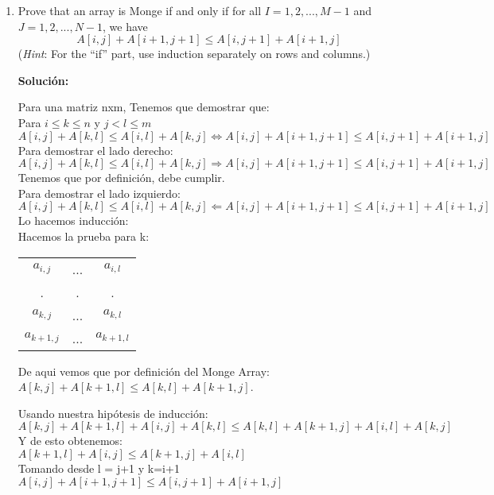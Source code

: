\documentclass{article}
\begin{document}
\begin{enumerate}[label=\textbf{\alph*.}]
  \item Prove that an array is Monge if and only if for all $I=1, 2, ..., M-1$ and $J=1, 2, ..., N-1$, we have
  $$A[i, j] + A[i+1, j+1] \leq A[i, j+1] + A[i+1, j]$$
  (\emph{Hint}: For the ``if'' part, use induction separately on rows and columns.)
  
  \textbf{Solución:}
  
  Para una matriz nxm, Tenemos que demostrar que:\\
  Para $i \leq k \leq n$ y $j < l \leq m$\\
  $A[i, j] + A[k, l] \leq A[i, l] + A[k, j] \Leftrightarrow A[i, j] + A[i+1, j+1] \leq A[i, j+1] + A[i+1, j]$\\
  
  Para demostrar el lado derecho:\\
  $A[i, j] + A[k, l] \leq A[i, l] + A[k, j] \Rightarrow A[i, j] + A[i+1, j+1] \leq A[i, j+1] + A[i+1, j]$\\
  Tenemos que por definición, debe cumplir.\\
  
  
  Para demostrar el lado izquierdo:\\
  $A[i, j] + A[k, l] \leq A[i, l] + A[k, j] \Leftarrow A[i, j] + A[i+1, j+1] \leq A[i, j+1] + A[i+1, j]$\\
  Lo hacemos inducción:\\
  Hacemos la prueba para k:\\
  \begin{center}
    \begin{tabular}{ccc}
      $a_{i,j}$ & ... & $a_{i,l}$\\
      . & . & .\\
      $a_{k,j}$ &  ... & $a_{k,l}$\\
      $a_{k+1,j}$ & ... & $a_{k+1,l}$
    \end{tabular}
  \end{center}
  
  De aqui vemos que por definición del Monge Array:\\
  $A[k, j] + A[k+1, l] \leq A[k, l] + A[k+1, j]$.
  
  Usando nuestra hipótesis de inducción:\\
  $A[k, j] + A[k+1, l] + A[i,j] + A[k,l] \leq A[k, l] + A[k+1, j] + A[i,l] + A[k,j]$\\
  Y de esto obtenemos:\\
  $A[k+1, l] + A[i,j] \leq  A[k+1, j] + A[i,l]$\\
  Tomando desde l = j+1 y k=i+1\\
  $A[i,j] + A[i+1, j+1] \leq A[i,j+1] + A[i+1, j]$\\
  

\end{enumerate}
\end{document}
